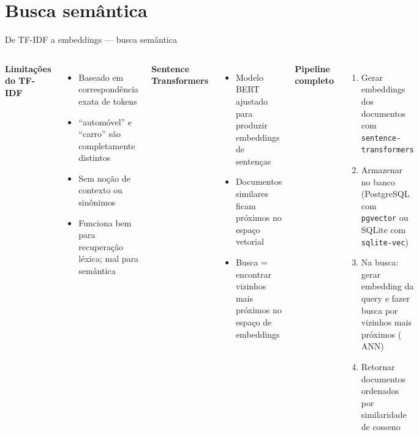 \documentclass[xcolor=dvipsnames,t,aspectratio=169]{beamer}
\newcommand{\highlight}[1]{{\color{nes_dark_orange} #1}}
\begin{document}
\section{Busca semântica}

\begin{frame}[c]{De TF-IDF a embeddings — busca semântica}

\begin{columns}
\textbf{\color{nes_dark_purple}Limitações do TF-IDF}
\begin{itemize}
    \item Baseado em \highlight{correspondência exata} de tokens
    \item ``automóvel'' e ``carro'' são completamente distintos
    \item Sem noção de contexto ou sinônimos
    \item Funciona bem para recuperação léxica; mal para semântica
\end{itemize}

\vspace{0.4em}
\textbf{\color{nes_dark_purple}Sentence Transformers}
\begin{itemize}
    \item Modelo BERT ajustado para produzir \highlight{embeddings de sentenças}
    \item Documentos similares ficam próximos no espaço vetorial
    \item Busca = encontrar vizinhos mais próximos no espaço de embeddings
\end{itemize}

\textbf{\color{nes_dark_purple}Pipeline completo}
\begin{enumerate}
    \item Gerar embeddings dos documentos com \texttt{sentence-transformers}
    \item Armazenar no banco (PostgreSQL com \texttt{pgvector} ou SQLite com \texttt{sqlite-vec})
    \item Na busca: gerar embedding da query e fazer busca por vizinhos mais próximos (\highlight{ANN})
    \item Retornar documentos ordenados por similaridade de cosseno
\end{enumerate}
\end{columns}

\end{frame}
\end{document}
